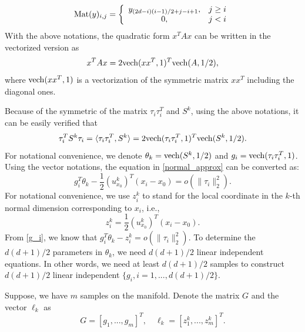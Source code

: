 \documentclass{article}
\theoremstyle{remark}
\begin{document}
\[
{\rm Mat} (y) _{i,j} =\left\{
\begin{array}{cc}
 y_{{(2d-i)(i-1)}/{2}+j-i+1},& j\geq i\\
 0,& j<i
\end{array}
 \right.
\]
With the above notations, the quadratic form $x^T A x$ can be written in the vectorized version as
\[
x^T A x = 2{\rm vech}(xx^T,1)^T {\rm vech}(A,1/2),
\]
where ${\rm vech}(xx^T,1)$ is a vectorization of the symmetric matrix $xx^T$ including the diagonal ones.




Because of the symmetric of the matrix $\tau_i\tau_i^T$ and $S^k$, using the above notations, it can be easily verified that
\[
\tau_i^TS^k\tau_i = \langle \tau_i\tau_i^T, S^k\rangle =2{\rm vech}(\tau_i\tau_i^T,1)^T {\rm vech}(S^k,1/2).%
\]
For notational convenience, we denote $\theta_k = {\rm vech}(S^k,1/2)$ and $g_i = {\rm vech}(\tau_i\tau_i^T,1)$.
Using the vector notations, the equation in \eqref{normal_approx} can be converted as:
\begin{equation}\label{g_i}
g_i^T \theta_k  - \frac{1}{2}{(u^k_{x_0})}^T (x_i -x_0) = o(\|\tau_i\|_2^2).
\end{equation}
For notational convenience, we use $z_i^k$ to stand for the local coordinate in the $k$-th normal dimension corresponding to $x_i$, i.e.,
\[
z_i^k =  \frac{1}{2}{(u^k_{x_0})}^T (x_i -x_0). %
\] 
From \eqref{g_i}, we know that
$
g_i^T \theta_k  - z_i^k= o(\|\tau_i\|_2^2).
$
To determine the ${d(d+1)}/{2}$ parameters in $\theta_k$, we need ${d(d+1)}/{2}$ linear independent equations. In other words, we need at least ${d(d+1)}/{2}$ samples to construct ${d(d+1)}/{2}$ linear independent $\{g_i, i = 1,...,{d(d+1)}/{2}\}$. 

Suppose, we have $m$ samples on the manifold. Denote the matrix $G$ and the vector $\ell_k$ as
\[
G = [g_1,...,g_m]^T, \quad \ell_k = [z_1^k,..., z^k_m ]^T.
\]
\end{document}
